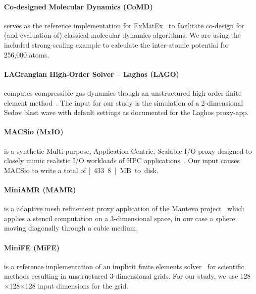 \paragraph{Co-designed Molecular Dynamics (CoMD)} serves as the reference implementation for
ExMatEx~\cite{mohd-yusof_co-design_2013} to facilitate co-design for (and evaluation of) classical molecular
dynamics algorithms.
We are using the included strong-scaling example to calculate the inter-atomic potential for 256,000 atoms.

\paragraph{LAGrangian High-Order Solver -- Laghos (LAGO)} computes compressible gas dynamics though
an unstructured high-order finite element method~\cite{dobrev_high-order_2012}. The input for our study is the
simulation of a 2-dimensional Sedov blast wave with default settings as documented for the
Laghos proxy-app.

\paragraph{MACSio (MxIO)} is a synthetic Multi-purpose, Application-Centric,
Scalable I/O proxy designed to closely mimic realistic I/O workloads of
HPC applications~\cite{dickson_replicating_2016}. Our input causes MACSio to write a total of \unit[433.8]{MB} to disk.

\paragraph{MiniAMR (MAMR)} is a adaptive mesh refinement proxy application of the Mantevo 
project~\cite{heroux_improving_2009} which applies a stencil computation on a 3-dimensional space,
in our case a sphere moving diagonally through a cubic medium.

\paragraph{MiniFE (MiFE)} is a reference implementation of an implicit finite elements 
solver~\cite{heroux_improving_2009} for scientific methods resulting in unstructured 3-dimensional grids.
For our study, we use 128$\times$128$\times$128 input dimensions for the grid.

